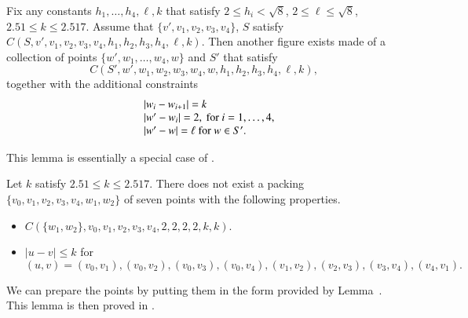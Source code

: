 \begin{tarskidata}
\begin{tarski}
\begin{lemma}
Fix any constants $h_1,\ldots,h_4,\ell,k$ that satisfy
$2\le h_i<\sqrt{8}$, $2\le \ell\le\sqrt8$, $2.51\le k \le 2.517$.
Assume that $\{v',v_1,v_2,v_3,v_4\}$, $S$ satisfy $C(S,v',v_1,v_2,v_3,v_4,h_1,h_2,h_3,h_4,\ell,k)$. 
Then another figure exists made of
a collection of points $\{w',w_1,\ldots,w_4,w\}$ and $S'$ that satisfy
  $$
  C(S',w',w_1,w_2,w_3,w_4,w,h_1,h_2,h_3,h_4,\ell,k),
  $$
together with the additional constraints
    $$
    \begin{array}{lll}
    &|w_i-w_{i+1}|=k\\
    &|w'-w_i|=2, \hbox { for } i=1,\ldots,4,\\
    &|w'-w|=\ell \hbox { for } w\in S'.
    \end{array}
    $$
\end{lemma}

\begin{proved} This  lemma is essentially a special case of
\cite[Lemma~4.3]{part1}.
\swallowed\end{proved}
\end{tarski}


\begin{tarski}

\begin{lemma}
Let $k$ satisfy $2.51\le k\le 2.517$.
There does not exist a packing $\{v_0,v_1,v_2,v_3,v_4,w_1,w_2\}$ of seven points with the
following properties.
\begin{itemize}
\item $C(\{w_1,w_2\},v_0,v_1,v_2,v_3,v_4,2,2,2,2,k,k)$.
\item $|u-v|\le k$ for
  $$(u,v)=(v_0,v_1), (v_0,v_2), (v_0,v_3), (v_0,v_4), 
  (v_1,v_2), (v_2,v_3), (v_3,v_4), (v_4,v_1).$$
\end{itemize}
\end{lemma}

\begin{proved} We can prepare the points by putting them in the form provided by Lemma~.
This lemma is then proved in \cite[Lemma~4.2]{part1}.
\end{proved}
\end{tarski}



\end{tarskidata}
